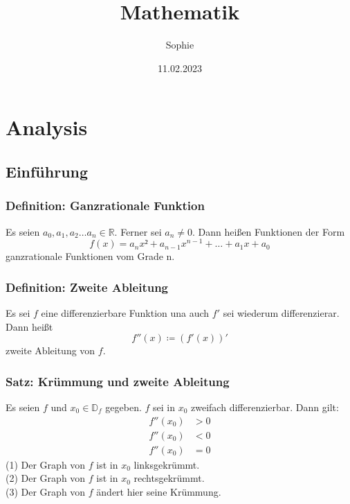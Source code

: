\documentclass{article}
\title{Mathematik}
\date{11.02.2023}
\author{Sophie}
\begin{document}
  \maketitle
  \newpage
  
  \section{Analysis}
  
  \subsection{Einführung}
  
  \subsubsection{Definition: Ganzrationale Funktion}
  Es seien $a_0, a_1, a_2 \ldots a_n \in \mathbb{R}$. Ferner sei $a_n \ne 0$. Dann heißen Funktionen der Form
  \begin{equation*}
  	f(x) = a_n x² + a_{n - 1} x^{n-1} + \ldots + a_1 x + a_0
  \end{equation*}
  ganzrationale Funktionen vom Grade n.
  
  \subsubsection{Definition: Zweite Ableitung}
  Es sei $f$ eine differenzierbare Funktion una auch $f'$ sei wiederum differenzierar. Dann heißt
  \begin{equation*}
  	f''(x) \coloneqq (f'(x))'
  \end{equation*}
  zweite Ableitung von $f$.
  
  \subsubsection{Satz: Krümmung und zweite Ableitung}
  Es seien $f$ und $x_0 \in \mathbb{D}_f$ gegeben. $f$ sei in $x_0$ zweifach differenzierbar. Dann gilt: 
  \begin{align}
  	f''(x_0) &> 0 \\
  	f''(x_0) &< 0 \\
  	f''(x_0) &= 0
  \end{align}
  (1) Der Graph von $f$ ist in $x_0$ linksgekrümmt. \\
  (2) Der Graph von $f$ ist in $x_0$ rechtsgekrümmt. \\
  (3) Der Graph von $f$ ändert hier seine Krümmung.
  
\end{document}
